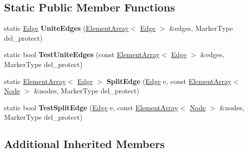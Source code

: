 \subsection*{Static Public Member Functions}
\begin{DoxyCompactItemize}
\item 
\hypertarget{classINMOST_1_1Edge_a7c11107844dad9c11946e26d079ef457}{static \hyperlink{classINMOST_1_1Edge}{Edge} {\bfseries Unite\-Edges} (\hyperlink{classINMOST_1_1ElementArray}{Element\-Array}$<$ \hyperlink{classINMOST_1_1Edge}{Edge} $>$ \&edges, Marker\-Type del\-\_\-protect)}\label{classINMOST_1_1Edge_a7c11107844dad9c11946e26d079ef457}

\item 
\hypertarget{classINMOST_1_1Edge_aca593e1b64452350f6adc6e8838f1877}{static bool {\bfseries Test\-Unite\-Edges} (const \hyperlink{classINMOST_1_1ElementArray}{Element\-Array}$<$ \hyperlink{classINMOST_1_1Edge}{Edge} $>$ \&edges, Marker\-Type del\-\_\-protect)}\label{classINMOST_1_1Edge_aca593e1b64452350f6adc6e8838f1877}

\item 
\hypertarget{classINMOST_1_1Edge_a9895ad12b476e4a7e8f57a7ae1d8d32b}{static \hyperlink{classINMOST_1_1ElementArray}{Element\-Array}$<$ \hyperlink{classINMOST_1_1Edge}{Edge} $>$ {\bfseries Split\-Edge} (\hyperlink{classINMOST_1_1Edge}{Edge} e, const \hyperlink{classINMOST_1_1ElementArray}{Element\-Array}$<$ \hyperlink{classINMOST_1_1Node}{Node} $>$ \&nodes, Marker\-Type del\-\_\-protect)}\label{classINMOST_1_1Edge_a9895ad12b476e4a7e8f57a7ae1d8d32b}

\item 
\hypertarget{classINMOST_1_1Edge_a1c492e4e1cdf20810332a5f4f0cf4605}{static bool {\bfseries Test\-Split\-Edge} (\hyperlink{classINMOST_1_1Edge}{Edge} e, const \hyperlink{classINMOST_1_1ElementArray}{Element\-Array}$<$ \hyperlink{classINMOST_1_1Node}{Node} $>$ \&nodes, Marker\-Type del\-\_\-protect)}\label{classINMOST_1_1Edge_a1c492e4e1cdf20810332a5f4f0cf4605}

\end{DoxyCompactItemize}
\subsection*{Additional Inherited Members}


